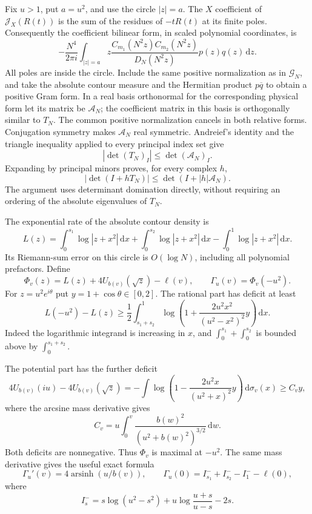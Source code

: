 \documentclass[11pt]{article}
\theoremstyle{definition}\newtheorem{definition}[theorem]{Definition}
\theoremstyle{remark}\newtheorem{remark}[theorem]{Remark}
\begin{document}
Fix $u>1$, put $a=u^2$, and use the circle $|z|=a$.  The $X$ coefficient
of $\mathcal J_X(R(t))$ is the sum of the residues of $-tR(t)$ at its
finite poles.  Consequently the coefficient bilinear form, in scaled
polynomial coordinates, is
\[
 -\frac{N^4}{2\pi i}\int_{|z|=a}
 z\frac{C_{m_1}(N^2z)C_{m_2}(N^2z)}{D_N(N^2z)}p(z)q(z)\,\mathrm dz.
\]
All poles are inside the circle.  Include the same positive normalization
as in $\mathcal G_N$, and take the absolute contour measure and the
Hermitian product $p\overline q$ to obtain a positive Gram form.
In a real basis orthonormal for the corresponding physical form let its
matrix be $\mathcal A_N$; the coefficient matrix in this basis is
orthogonally similar to $T_N$.  The common positive normalization cancels
in both relative forms.  Conjugation symmetry makes $\mathcal A_N$ real
symmetric.  Andreief's identity and
the triangle inequality applied to every principal index set give
\[
 |\det(T_N)_I|\le\det(\mathcal A_N)_I.
\]
Expanding by principal minors proves, for every complex $h$,
\begin{equation}\label{z3a:majorant}
 |\det(I+hT_N)|\le\det(I+|h|\mathcal A_N).
\end{equation}
The argument uses determinant domination directly, without requiring an ordering of the absolute eigenvalues of $T_N$.

The exponential rate of the absolute contour density is
\[
 L(z)=\int_0^{s_1}\log|z+x^2|\,\mathrm dx
     +\int_0^{s_2}\log|z+x^2|\,\mathrm dx
     -\int_0^1\log|z+x^2|\,\mathrm dx.
\]
Its Riemann-sum error on this circle is $O(\log N)$, including all
polynomial prefactors.  Define
\[
 \Phi_v(z)=L(z)+4U_{b(v)}(\sqrt z)-\ell(v),\qquad
 \Gamma_u(v)=\Phi_v(-u^2).
\]
For $z=u^2e^{i\theta}$ put $y=1+\cos\theta\in[0,2]$.  The rational part
has deficit at least
\begin{equation}\label{z3a:rational-deficit}
 L(-u^2)-L(z)\ge\frac12\int_{s_1+s_2}^1
 \log\left(1+\frac{2u^2x^2}{(u^2-x^2)^2}y\right)\,\mathrm dx.
\end{equation}
Indeed the logarithmic integrand is increasing in $x$, and
$\int_0^{s_1}+\int_0^{s_2}$ is bounded above by $\int_0^{s_1+s_2}$.

The potential part has the further deficit
\[
 4U_{b(v)}(iu)-4U_{b(v)}(\sqrt z)
 =-\int\log\left(1-\frac{2u^2x}{(u^2+x)^2}y\right)
                 \,\mathrm d\sigma_v(x)
 \ge C_vy,
\]
where the arcsine mass derivative gives
\begin{equation}\label{z3a:linear}
 C_v=u\int_0^v\frac{b(w)^2}{(u^2+b(w)^2)^{3/2}}\,\mathrm dw.
\end{equation}
Both deficits are nonnegative.  Thus $\Phi_v$ is maximal at $-u^2$.
The same mass derivative gives the useful exact formula
\begin{equation}\label{z3a:Gamma}
 \Gamma_u'(v)=4\operatorname{arsinh}(u/b(v)),\qquad
 \Gamma_u(0)=I^-_{s_1}+I^-_{s_2}-I^-_1-\ell(0),
\end{equation}
where
\[
 I^-_s=s\log(u^2-s^2)+u\log\frac{u+s}{u-s}-2s.
\]
\end{document}
